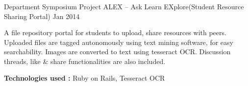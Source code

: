 \begin{cventries}

  \cventry
    {Department Symposium Project} %
    {ALEX – Ask Learn EXplore(Student Resource Sharing Portal)} %
    {} %
    {Jan 2014} %
    {
      \begin{cvitems}
      \item{A file repository portal for students to upload, share resources with peers. Uploaded files are tagged autonomously using text mining software, for easy searchability. Images are converted to text using tesseract OCR. Discussion threads, like \& share functionalities are also included.}
      \item{\textbf{Technologies used :} Ruby on Rails, Tesseract OCR}
      \end{cvitems}
    }
\end{cventries}
